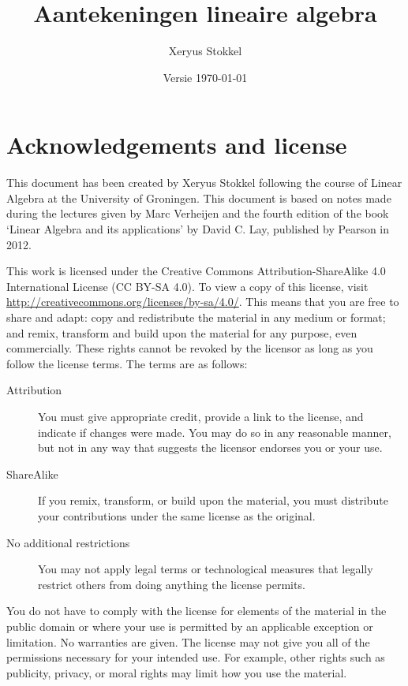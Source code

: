 \documentclass[a4paper]{article}
\title{Aantekeningen lineaire algebra}
\author{Xeryus Stokkel}
\date{Versie \today}
\begin{document}
\maketitle

\section*{Acknowledgements and license}
This document has been created by Xeryus Stokkel following the course of Linear Algebra at the University of Groningen. This document is based on notes made during the lectures given by Marc Verheijen and the fourth edition of the book `Linear Algebra and its applications' by David C. Lay, published by Pearson in 2012.

This work is licensed under the Creative Commons Attribution-ShareAlike 4.0 International License (CC BY-SA 4.0). To view a copy of this license, visit \url{http://creativecommons.org/licenses/by-sa/4.0/}. This means that you are free to share and adapt: copy and redistribute the material in any medium or format; and remix, transform and build upon the material for any purpose, even commercially. These rights cannot be revoked by the licensor as long as you follow the license terms. The terms are as follows:
\begin{description}
	\item[Attribution] You must give appropriate credit, provide a link to the license, and indicate if changes were made. You may do so in any reasonable manner, but not in any way that suggests the licensor endorses you or your use.
	\item[ShareAlike] If you remix, transform, or build upon the material, you must distribute your contributions under the same license as the original.
	\item[No additional restrictions] You may not apply legal terms or technological measures that legally restrict others from doing anything the license permits.
\end{description}

You do not have to comply with the license for elements of the material in the public domain or where your use is permitted by an applicable exception or limitation. No warranties are given. The license may not give you all of the permissions necessary for your intended use. For example, other rights such as publicity, privacy, or moral rights may limit how you use the material.

\tableofcontents
\clearpage





















\appendix



\clearpage
{}
\printindex
\end{document}
